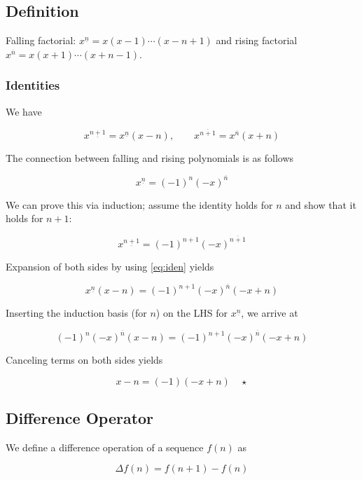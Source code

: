 
\subsection{Definition}

Falling factorial: $x^{\underline{n}} = x(x-1)\cdots(x-n+1)$ and rising factorial $x^{\overline{n}} = x(x+1)\cdots(x+n-1)$.

\subsubsection{Identities}

We have

\begin{equation}
\label{eq:iden}
x^{\underline{n+1}} = x^{\underline{n}} (x-n), \qquad x^{\overline{n+1}} = x^{\overline{n}} (x+n)
\end{equation}

The connection between falling and rising polynomials is as follows

\begin{equation}
x^{\underline{n}} = (-1)^n (-x)^{\overline{n}}
\end{equation}

We can prove this via induction; assume the identity holds for $n$ and show that it holds for $n+1$:

\[x^{\underline{n+1}} = (-1)^{n+1} (-x)^{\overline{n+1}}\]

Expansion of both sides by using \eqref{eq:iden} yields

\[x^{\underline{n}}(x-n) = (-1)^{n+1} (-x)^{\overline{n}}(-x+n)\]

Inserting the induction basis (for $n$) on the LHS for $x^{\underline{n}}$, we arrive at

\[ (-1)^n (-x)^{\overline{n}} (x-n) = (-1)^{n+1} (-x)^{\overline{n}}(-x+n)\]

Canceling terms on both sides yields

\[ x-n = (-1)(-x+n) \quad \star\]

\subsection{Difference Operator}

We define a difference operation of a sequence $f(n)$ as

\begin{equation}
\Delta f(n) = f(n+1) - f(n)
\end{equation}

